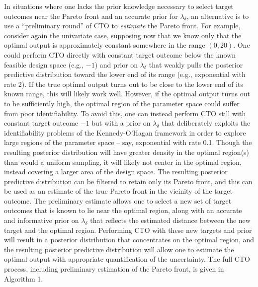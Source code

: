 \documentclass[12pt]{article}
\begin{document}
%
In situations where one lacks the prior knowledge necessary to select target outcomes near the Pareto front and an accurate prior for $\lambda_\delta$, an alternative is to use a ``preliminary round'' of CTO to {\em estimate} the Pareto front.
%
For example, consider again the univariate case, supposing now that we know only that the optimal output is approximately constant somewhere in the range $(0,20)$. 
%
One could perform CTO directly with constant target outcome below the known feasible design space (e.g., $-1$) and prior on $\lambda_\delta$ that weakly pulls the posterior predictive distribution toward the lower end of its range (e.g., exponential with rate 2).
%
If the true optimal output turns out to be close to the lower end of its known range, this will likely work well.
%
However, if the optimal output turns out to be sufficiently high, the optimal region of the parameter space could suffer from poor identifiability.
%
To avoid this, one can instead perform CTO still with constant target outcome $-1$ but with a prior on $\lambda_\delta$ that deliberately exploits the identifiability problems of the Kennedy-O'Hagan framework in order to explore large regions of the parameter space -- say, exponential with rate 0.1.
% 
Though the resulting posterior distribution will have greater density in the optimal region(s) than would a uniform sampling, it will likely not center in the optimal region, instead covering a larger area of the design space.
%
The resulting posterior predictive distribution can be filtered to retain only its Pareto front, and this can be used as an estimate of the true Pareto front in the vicinity of the target outcome.
%
%
The preliminary estimate allows one to select a new set of target outcomes that is known to lie near the optimal region, along with an accurate and informative prior on $\lambda_\delta$ that reflects the estimated distance between the new target and the optimal region.
%
Performing CTO with these new targets and prior will result in a posterior distribution that concentrates on the optimal region, and the resulting posterior predictive distribution will allow one to estimate the optimal output with appropriate quantification of the uncertainty.
%
%
%
The full CTO process, including preliminary estimation of the Pareto front, is given in Algorithm 1.
\end{document}

